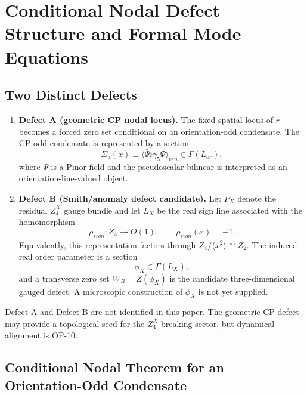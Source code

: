 \documentclass[11pt]{article}
\theoremstyle{canonmath}
\theoremstyle{canonpostulate}
\theoremstyle{canonclaim}
\providecommand{\Lor}{\mathcal L_{\mathrm{or}}}
\def\mathrm#1{#1}%
\def\mathbb#1{#1}%
\def\mathcal#1{#1}%
\begin{document}
\section{Conditional Nodal Defect Structure and Formal Mode Equations}
\label{sec:wall}

\subsection{Two Distinct Defects}

\begin{enumerate}
\item \textbf{Defect A (geometric CP nodal locus).} The fixed spatial locus of $r$ becomes a forced zero set conditional on an orientation-odd condensate. The CP-odd condensate is represented by a section
\begin{equation}
\Sigma_5(x)
\equiv
\langle\bar\Psi i\gamma_5\Psi\rangle_{\mathrm{ren}}
\in\Gamma(\Lor),
\end{equation}
where $\Psi$ is a Pinor field and the pseudoscalar bilinear is interpreted as an orientation-line-valued object.

\item \textbf{Defect B (Smith/anomaly defect candidate).} Let $P_X$ denote the residual $\mathbb Z_4^X$ gauge bundle and let $L_X$ be the real sign line associated with the homomorphism
\begin{equation}
\rho_{\mathrm{sign}}:\mathbb Z_4\longrightarrow O(1),
\qquad
\rho_{\mathrm{sign}}(x)=-1.
\end{equation}
Equivalently, this representation factors through $\mathbb Z_4/\langle x^2\rangle\cong\mathbb Z_2$. The induced real order parameter is a section
\begin{equation}
\phi_X\in\Gamma(L_X),
\end{equation}
and a transverse zero set $W_B=Z(\phi_X)$ is the candidate three-dimensional gauged defect. A microscopic construction of $\phi_X$ is not yet supplied.
\end{enumerate}

Defect A and Defect B are not identified in this paper. The geometric CP defect may provide a topological seed for the $\mathbb Z_4^X$-breaking sector, but dynamical alignment is OP-10.

\subsection{Conditional Nodal Theorem for an Orientation-Odd Condensate}
\end{document}
